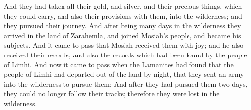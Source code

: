 \bverse \iffalse And they had taken all their gold, and silver, and their precious things, which they could carry, and also their provisions with them, into the wilderness; and they pursued their journey. \fi
And they had taken all their gold, and silver, and their precious things, which they could carry, and also their provisions with them, into the wilderness; and they pursued their journey.
\bverse \iffalse And after being many days in the wilderness they arrived in the land of Zarahemla, and joined Mosiah's people, and became his subjects. \fi
And after being many days in the wilderness they arrived in the land of Zarahemla, and joined Mosiah's people, and became his subjects.
\bverse \iffalse And it came to pass that Mosiah received them with joy; and he also received their records, and also the records which had been found by the people of Limhi. \fi
And it came to pass that Mosiah received them with joy; and he also received their records, and also the records which had been found by the people of Limhi.
\bverse \iffalse And now it came to pass when the Lamanites had found that the people of Limhi had departed out of the land by night, that they sent an army into the wilderness to pursue them; \fi
And now it came to pass when the Lamanites had found that the people of Limhi had departed out of the land by night, that they sent an army into the wilderness to pursue them;
\bverse \iffalse And after they had pursued them two days, they could no longer follow their tracks; therefore they were lost in the wilderness. \fi
And after they had pursued them two days, they could no longer follow their tracks; therefore they were lost in the wilderness.


